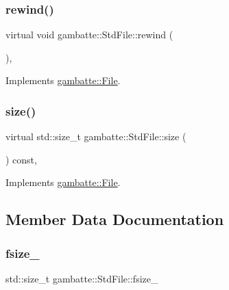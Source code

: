 \subsubsection{\texorpdfstring{rewind()}{rewind()}}
{\footnotesize\ttfamily virtual void gambatte\+::\+Std\+File\+::rewind (\begin{DoxyParamCaption}{ }\end{DoxyParamCaption})\hspace{0.3cm}{\ttfamily [inline]}, {\ttfamily [virtual]}}



Implements \hyperlink{classgambatte_1_1File_a37e873832be84757982d7a03662dfb95}{gambatte\+::\+File}.

\mbox{\label{classgambatte_1_1StdFile_aac486706e2f657b7396757ee9f8e7352}} 
\subsubsection{\texorpdfstring{size()}{size()}}
{\footnotesize\ttfamily virtual std\+::size\+\_\+t gambatte\+::\+Std\+File\+::size (\begin{DoxyParamCaption}{ }\end{DoxyParamCaption}) const\hspace{0.3cm}{\ttfamily [inline]}, {\ttfamily [virtual]}}



Implements \hyperlink{classgambatte_1_1File_a589f615d436595eb97cbb9b9dc36632e}{gambatte\+::\+File}.



\subsection{Member Data Documentation}
\mbox{\label{classgambatte_1_1StdFile_a67ba9f58b97f9265a1db204638005a4d}} 
\subsubsection{\texorpdfstring{fsize\+\_\+}{fsize\_}}
{\footnotesize\ttfamily std\+::size\+\_\+t gambatte\+::\+Std\+File\+::fsize\+\_\+\hspace{0.3cm}{\ttfamily [private]}}

